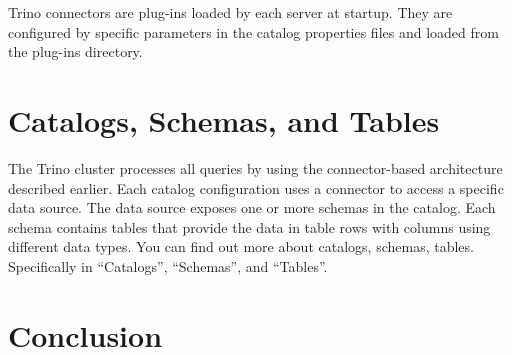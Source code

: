 Trino connectors are plug-ins loaded by each server at startup. They are configured by specific parameters in the catalog properties files and loaded from the plug-ins directory. 

\section{Catalogs, Schemas, and Tables}
The Trino cluster processes all queries by using the connector-based architecture described earlier. Each catalog configuration uses a connector to access a specific data source. The data source exposes one or more schemas in the catalog. Each schema contains tables that provide the data in table rows with columns using different data types. You can find out more about catalogs, schemas, tables. Specifically in “Catalogs”, “Schemas”, and “Tables”.


\section*{Conclusion}